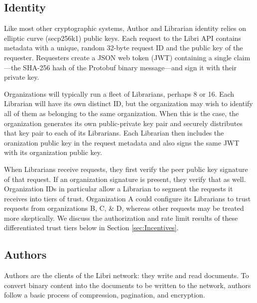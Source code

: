 \documentclass[10pt]{article}
\begin{document}
\subsection{Identity}
\label{sec:Identity}
Like most other cryptographic systems, Author and Librarian identity relies on elliptic curve (secp256k1) public keys. Each request to the Libri API contains metadata with a unique, random 32-byte request ID and the public key of the requester. Requesters create a JSON web token (JWT) containing a single claim---the SHA-256 hash of the Protobuf binary message---and sign it with their private key. 

Organizations will typically run a fleet of Librarians, perhaps 8 or 16. Each Librarian will have its own distinct ID, but the organization may wish to identify all of them as belonging to the same organization. When this is the case, the organization generates its own public-private key pair and securely distributes that key pair to each of its Librarians. Each Librarian then includes the oranization public key in the request metadata and also signs the same JWT with its organization public key.

When Librarians receive requests, they first verify the peer public key signature of that request. If an organization signature is present, they verify that as well. Organization IDs in particular allow a Librarian to segment the requests it receives into tiers of trust. Organization A could configure its Librarians to trust requests from organizations B, C, \& D, whereas other requests may be treated more skeptically. We discuss the authorization and rate limit results of these differentiated trust tiers below in Section \ref{sec:Incentives}.

\subsection{Authors}
\label{sec:Authors}

Authors are the clients of the Libri network: they write and read documents. To convert binary content into the documents to be written to the network, authors follow a basic process of compression, pagination, and encryption. 
\end{document}
